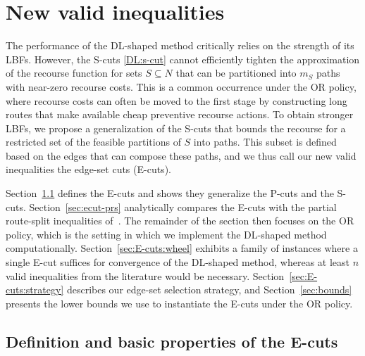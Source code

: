\documentclass{article}
\newcommand{\rev}[1]{{\color{black}#1}}
\begin{document}

\section{New valid inequalities} \label{sec:E-cuts}

The performance of the DL-shaped method critically relies on the strength of its LBFs. However, the S-cuts \eqref{DL:s-cut} cannot efficiently tighten the approximation of the recourse function for sets $S \subseteq N$ that can be partitioned into $m_S$ paths with \rev{near-zero} recourse costs. This is a common \rev{occurrence} under the OR policy, where recourse costs can often be moved to the first stage by constructing long routes that make available cheap preventive recourse actions. To obtain stronger LBFs, we propose a generalization of the S-cuts that bounds the recourse for a restricted set of the feasible partitions of $S$ into paths. This subset is defined based on the edges that can compose these paths, and we thus call our new valid inequalities the edge-set cuts (E-cuts).

\rev{Section~\ref{sec:E-cuts:def_and_validity} defines the E-cuts and shows they generalize the P-cuts and the S-cuts. Section~\ref{sec:ecut-prs} analytically compares the E-cuts with the partial route-split inequalities of~\cite{hoogendoorn2023improved}. The remainder of the section then focuses on the OR policy, which is the setting in which we implement the DL-shaped method computationally. Section~\ref{sec:E-cuts:wheel} exhibits a family of instances where a single E-cut suffices for convergence of the DL-shaped method, whereas at least $n$ valid inequalities from the literature would be necessary. Section~\ref{sec:E-cuts:strategy} describes our edge-set selection strategy, and Section~\ref{sec:bounds} presents the lower bounds we use to instantiate the E-cuts under the OR policy.}



\subsection{Definition and basic properties of the E-cuts} \label{sec:E-cuts:def_and_validity}
\end{document}
